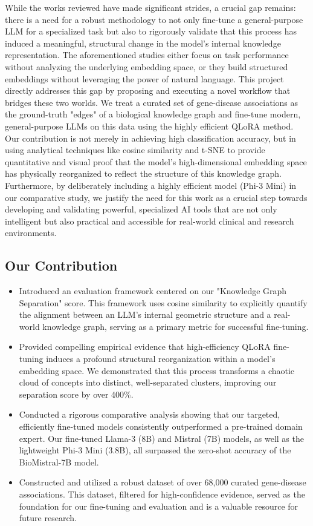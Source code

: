 \documentclass{article}
\begin{document}
While the works reviewed have made significant strides, a crucial gap remains: there is a need for a robust methodology to not only fine-tune a general-purpose LLM for a specialized task but also to rigorously validate that this process has induced a meaningful, structural change in the model's internal knowledge representation. The aforementioned studies either focus on task performance without analyzing the underlying embedding space, or they build structured embeddings without leveraging the power of natural language. This project directly addresses this gap by proposing and executing a novel workflow that bridges these two worlds. We treat a curated set of gene-disease associations as the ground-truth "edges" of a biological knowledge graph and fine-tune modern, general-purpose LLMs on this data using the highly efficient QLoRA method. Our contribution is not merely in achieving high classification accuracy, but in using analytical techniques like cosine similarity and t-SNE to provide quantitative and visual proof that the model's high-dimensional embedding space has physically reorganized to reflect the structure of this knowledge graph. Furthermore, by deliberately including a highly efficient model (Phi-3 Mini) in our comparative study, we justify the need for this work as a crucial step towards developing and validating powerful, specialized AI tools that are not only intelligent but also practical and accessible for real-world clinical and research environments.

\subsection{Our Contribution}
\begin{itemize}
\item Introduced an evaluation framework centered on our "Knowledge Graph Separation" score. This framework uses cosine similarity to explicitly quantify the alignment between an LLM's internal geometric structure and a real-world knowledge graph, serving as a primary metric for successful fine-tuning.

\item Provided compelling empirical evidence that high-efficiency QLoRA fine-tuning induces a profound structural reorganization within a model's embedding space. We demonstrated that this process transforms a chaotic cloud of concepts into distinct, well-separated clusters, improving our separation score by over 400\%.

\item Conducted a rigorous comparative analysis showing that our targeted, efficiently fine-tuned models consistently outperformed a pre-trained domain expert. Our fine-tuned Llama-3 (8B) and Mistral (7B) models, as well as the lightweight Phi-3 Mini (3.8B), all surpassed the zero-shot accuracy of the BioMistral-7B model.

\item Constructed and utilized a robust dataset of over 68,000 curated gene-disease associations. This dataset, filtered for high-confidence evidence, served as the foundation for our fine-tuning and evaluation and is a valuable resource for future research.
\end{itemize}
\end{document}
